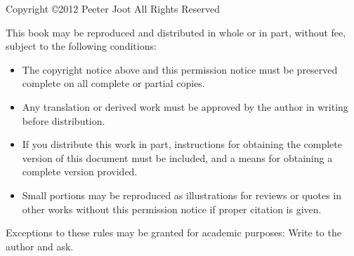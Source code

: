 


Copyright \copyright 2012 Peeter Joot
All Rights Reserved

This book may be reproduced and distributed in whole or in part, without fee, subject to the following conditions:

\begin{itemize}\item The copyright notice above and this permission notice must be preserved complete on all complete or partial copies.

\item Any translation or derived work must be approved by the author in writing before distribution.

\item If you distribute this work in part, instructions for obtaining the complete version of this document must be included, and a means for obtaining a complete version provided.

\item Small portions may be reproduced as illustrations for reviews or quotes in other works without this permission notice if proper citation is given.
\end{itemize}

Exceptions to these rules may be granted for academic purposes: Write to the author and ask.



